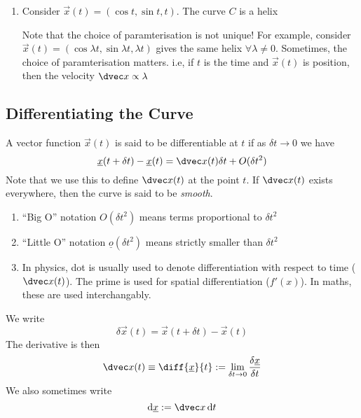\documentclass{article}
\numberwithin{equation}{section}
\begin{document}
\begin{eg}
\begin{enumerate}
    \item Consider $\vec x (t) = (\cos t, \sin t, t)$. The curve $C$ is a helix
    \begin{center}
    \end{center}
    Note that the choice of paramterisation is not unique!
    For example, consider $\vec x(t) = (\cos \lambda t, \sin \lambda t, \lambda t)$ gives the same helix $\forall \lambda \neq 0$.
    Sometimes, the choice of paramterisation matters. i.e, if $t$ is the time and $\vec x(t)$ is position, then the velocity $\dvec x \propto \lambda$
\end{enumerate}
\end{eg}

\subsection{Differentiating the Curve}
A vector function $\vec x(t)$ is said to be differentiable at $t$ if as $\delta t \rightarrow 0$ we have
\[ \vec x(t + \delta t) - \vec x(t) = \dvec x(t)\delta t + O(\delta t^2)\]
Note that we use this to define $\dvec x(t)$ at the point $t$.
If $\dvec x(t)$ exists everywhere, then the curve is said to be \emph{smooth}.

\begin{remark}
    \begin{enumerate}
        \item ``Big O'' notation $O(\delta t^2)$ means terms proportional to $\delta t^2$
        \item ``Little O'' notation $\underline{o}(\delta t^2)$ means strictly smaller than $\delta t^2$
        \item In physics, dot is usually used to denote differentiation with respect to time ($\dvec x(t)$).
        The prime is used for spatial differentiation ($f'(x)$). In maths, these are used interchangably.
    \end{enumerate}
\end{remark}

\begin{notation}
    We write
    \[
        \delta \vec x(t) = \vec x(t + \delta t) - \vec x(t)   
    \]
    The derivative is then
    \[ \dvec x(t) \equiv \diff {\vec x}{t} := \lim_{\delta t \rightarrow 0} \frac{\delta \vec x}{\delta t}\]
    We also sometimes write
    \[ \diffd \vec x := \dvec x \diffd t\]
\end{notation}
\end{document}
